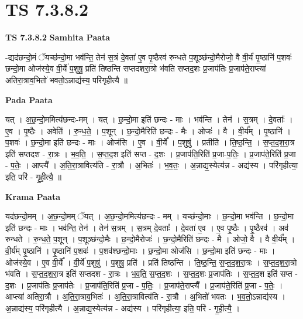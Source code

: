 \documentclass[17pt]{extarticle}
\begin{document}
\section{ TS 7.3.8.2 }

\textbf{TS 7.3.8.2 } \newline
\textbf{Samhita Paata} \newline

-द्यद॑छन्दो॒मं ॅयच्छ॑न्दो॒मा भव॑न्ति॒ तेन॑ स॒त्रं दे॒वता॑ ए॒व पृ॒ष्ठैरव॑ रुन्धते प॒शूञ्छ॑न्दो॒मैरोजो॒ वै वी॒र्यं॑ पृ॒ष्ठानि॑ प॒शवः॑ छन्दो॒मा ओज॑स्ये॒व वी॒र्ये॑ प॒शुषु॒ प्रति॑ तिष्ठन्ति सप्तदशरा॒त्रो भ॑वति सप्तद॒शः प्र॒जाप॑तिः प्र॒जाप॑ते॒राप्त्या॑ अतिरा॒त्राव॒भितो॑ भवतो॒ऽन्नाद्य॑स्य॒ परि॑गृहीत्यै ॥ \newline

\textbf{Pada Paata} \newline

यत् । अ॒छ॒न्दो॒ममित्य॑छन्दः-मम् । यत् । छ॒न्दो॒मा इति॑ छन्दः - माः । भव॑न्ति । तेन॑ । स॒त्रम् । दे॒वताः᳚ । ए॒व । पृ॒ष्ठैः । अवेति॑ । रु॒न्ध॒ते॒ । प॒शून् । छ॒न्दो॒मैरिति॑ छन्दः - मैः । ओजः॑ । वै । वी॒र्य᳚म् । पृ॒ष्ठानि॑ । प॒शवः॑ । छ॒न्दो॒मा इति॑ छन्दः - माः । ओज॑सि । ए॒व । वी॒र्ये᳚ । प॒शुषु॑ । प्रतीति॑ । ति॒ष्ठ॒न्ति॒ । स॒प्त॒द॒श॒रा॒त्र इति॑ सप्तदश - रा॒त्रः । भ॒व॒ति॒ । स॒प्त॒द॒श इति॑ सप्त - द॒शः । प्र॒जाप॑ति॒रिति॑ प्र॒जा-प॒तिः॒ । प्र॒जाप॑ते॒रिति॑ प्र॒जा - प॒तेः॒ । आप्त्यै᳚ । अ॒ति॒रा॒त्रावित्य॑ति - रा॒त्रौ । अ॒भितः॑ । भ॒व॒तः॒ । अ॒न्नाद्य॒स्येत्य॑न्न - अद्य॑स्य । परि॑गृहीत्या॒ इति॒ परि॑ - गृ॒ही॒त्यै॒ ॥  \newline


\textbf{Krama Paata} \newline

यद॑छन्दो॒मम् । अ॒छ॒न्दो॒मम् ॅयत् । अ॒छ॒न्दो॒ममित्य॑छन्दः - मम् । यच्छ॑न्दो॒माः । छ॒न्दो॒मा भव॑न्ति । छ॒न्दो॒मा इति॑ छन्दः - माः । भव॑न्ति॒ तेन॑ । तेन॑ स॒त्रम् । स॒त्रम् दे॒वताः᳚ । दे॒वता॑ ए॒व । ए॒व पृ॒ष्ठैः । पृ॒ष्ठैरव॑ । अव॑ रुन्धते । रु॒न्ध॒ते॒ प॒शून् । प॒शूञ्छ॑न्दो॒मैः । छ॒न्दो॒मैरोजः॑ । छ॒न्दो॒मैरिति॑ छन्दः - मै । ओजो॒ वै । वै वी॒र्य᳚म् । वी॒र्य॑म् पृ॒ष्ठानि॑ । पृ॒ष्ठानि॑ प॒शवः॑ । प॒शव॑श्छन्दो॒माः । छ॒न्दो॒मा ओज॑सि । छ॒न्दो॒मा इति॑ छन्दः - माः । ओज॑स्ये॒व । ए॒व वी॒र्ये᳚ । वी॒र्ये॑ प॒शुषु॑ । प॒शुषु॒ प्रति॑ । प्रति॑ तिष्ठन्ति । ति॒ष्ठ॒न्ति॒ स॒प्त॒द॒श॒रा॒त्रः । स॒प्त॒द॒श॒रा॒त्रो भ॑वति । स॒प्त॒द॒श॒रा॒त्र इति॑ सप्तदश - रा॒त्रः । भ॒व॒ति॒ स॒प्त॒द॒शः । स॒प्त॒द॒शः प्र॒जाप॑तिः । स॒प्त॒द॒श इति॑ सप्त - द॒शः । प्र॒जाप॑तिः प्र॒जाप॑तेः । प्र॒जाप॑ति॒रिति॑ प्र॒जा - प॒तिः॒ । प्र॒जाप॑ते॒राप्त्यै᳚ । प्र॒जाप॑ते॒रिति॑ प्र॒जा - प॒तेः॒ । आप्त्या॑ अतिरा॒त्रौ । अ॒ति॒रा॒त्राव॒भितः॑ । अ॒ति॒रा॒त्रावित्य॑ति - रा॒त्रौ । अ॒भितो॑ भवतः । भ॒व॒तो॒ऽन्नाद्य॑स्य । अ॒न्नाद्य॑स्य॒ परि॑गृहीत्यै । अ॒न्नाद्य॒स्येत्य॑न्न - अद्य॑स्य । परि॑गृहीत्या॒ इति॒ परि॑ - गृ॒ही॒त्यै॒ । \newline
\end{document}
